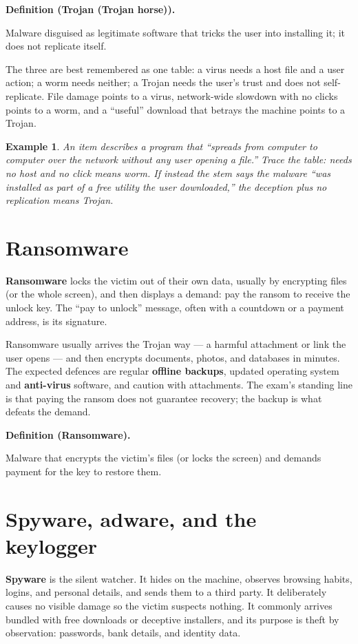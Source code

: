 \documentclass[11pt]{article}
\newtheorem{example}{Example}[section]
\newenvironment{definitionbox}[1]{%
  \par\noindent\textbf{Definition (#1).}\ \itshape
}{\par\vspace{0.3em}}
\begin{document}
\begin{definitionbox}{Trojan (Trojan horse)}
Malware disguised as legitimate software that tricks the user into
installing it; it does not replicate itself.
\end{definitionbox}

The three are best remembered as one table: a virus needs a host file and a
user action; a worm needs neither; a Trojan needs the user's trust and does
not self-replicate. File damage points to a virus, network-wide slowdown
with no clicks points to a worm, and a ``useful'' download that betrays the
machine points to a Trojan.

\begin{example}
An item describes a program that ``spreads from computer to computer over
the network without any user opening a file.'' Trace the table: needs no
host and no click means worm. If instead the stem says the malware ``was
installed as part of a free utility the user downloaded,'' the deception
plus no replication means Trojan.
\end{example}

\section{Ransomware}
\textbf{Ransomware} locks the victim out of their own data, usually by
encrypting files (or the whole screen), and then displays a demand: pay the
ransom to receive the unlock key. The ``pay to unlock'' message, often with
a countdown or a payment address, is its signature.

Ransomware usually arrives the Trojan way --- a harmful attachment or link
the user opens --- and then encrypts documents, photos, and databases in
minutes. The expected defences are regular \textbf{offline backups}, updated
operating system and \textbf{anti-virus} software, and
caution with attachments. The exam's standing line is that paying the ransom
does not guarantee recovery; the backup is what defeats the demand.

\begin{definitionbox}{Ransomware}
Malware that encrypts the victim's files (or locks the screen) and demands
payment for the key to restore them.
\end{definitionbox}

\section{Spyware, adware, and the keylogger}
\textbf{Spyware} is the silent watcher. It hides on the machine, observes
browsing habits, logins, and personal details, and sends them to a third
party. It deliberately causes no visible damage so the victim suspects
nothing. It commonly arrives bundled with free downloads or deceptive
installers, and its purpose is theft by observation: passwords, bank
details, and identity data.
\end{document}
